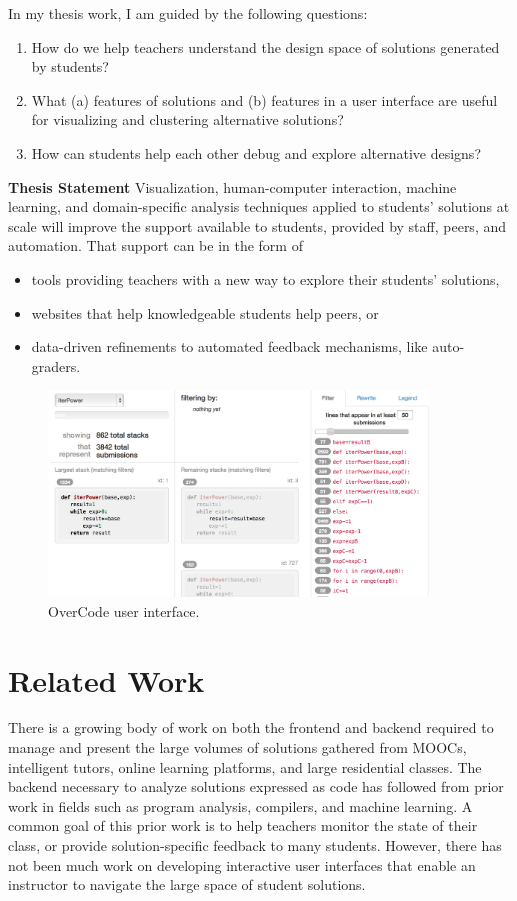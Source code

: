 \documentclass{sigchi}
\begin{document}
In my thesis work, I am guided by the following questions:
\begin{enumerate}
\item How do we help teachers understand the design space of solutions generated by students?
\item What (a) features of solutions and (b) features in a user interface are useful for visualizing and clustering alternative solutions?
\item How can students help each other debug and explore alternative designs?
\end{enumerate}

{\bf Thesis Statement} Visualization, human-computer interaction, machine learning, and domain-specific analysis techniques applied to students' solutions at scale will improve the support available to students, provided by staff, peers, and automation. That support can be in the form of 
\begin{itemize}
\item tools providing teachers with a new way to explore their students' solutions,
\item websites that help knowledgeable students help peers, or 
\item data-driven refinements to automated feedback mechanisms, like auto-graders. 
\end{itemize}

\begin{figure}[t!]
\centering
\includegraphics[width=0.9\textwidth]{frontPageInterfacePreview.png}
\caption{OverCode user interface.}
\label{fig:figure1}
\end{figure}

\section{Related Work}

There is a growing body of work on both the frontend and backend required to manage and present the large volumes of solutions gathered from MOOCs, intelligent tutors, online learning platforms, and large residential classes. The backend necessary to analyze solutions expressed as code has followed from prior work in fields such as program analysis, compilers, and machine learning. A common goal of this prior work is to help teachers monitor the state of their class, or provide solution-specific feedback to many students. However, there has not been much work on developing interactive user interfaces that enable an instructor to navigate the large space of student solutions.
\end{document}
